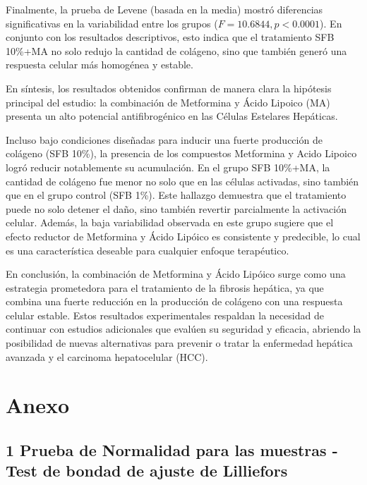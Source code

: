 \documentclass[
  11pt,
]{article}
\begin{document}
Finalmente, la prueba de Levene (basada en la media) mostró diferencias
significativas en la variabilidad entre los grupos
(\(F = 10.6844, p < 0.0001\)). En conjunto con los resultados
descriptivos, esto indica que el tratamiento SFB 10\%+MA no solo redujo
la cantidad de colágeno, sino que también generó una respuesta celular
más homogénea y estable.

En síntesis, los resultados obtenidos confirman de manera clara la
hipótesis principal del estudio: la combinación de Metformina y Ácido
Lipoico (MA) presenta un alto potencial antifibrogénico en las Células
Estelares Hepáticas.

Incluso bajo condiciones diseñadas para inducir una fuerte producción de
colágeno (SFB 10\%), la presencia de los compuestos Metformina y Acido
Lipoico logró reducir notablemente su acumulación. En el grupo SFB
10\%+MA, la cantidad de colágeno fue menor no solo que en las células
activadas, sino también que en el grupo control (SFB 1\%). Este hallazgo
demuestra que el tratamiento puede no solo detener el daño, sino también
revertir parcialmente la activación celular. Además, la baja
variabilidad observada en este grupo sugiere que el efecto reductor de
Metformina y Ácido Lipóico es consistente y predecible, lo cual es una
característica deseable para cualquier enfoque terapéutico.

En conclusión, la combinación de Metformina y Ácido Lipóico surge como
una estrategia prometedora para el tratamiento de la fibrosis hepática,
ya que combina una fuerte reducción en la producción de colágeno con una
respuesta celular estable. Estos resultados experimentales respaldan la
necesidad de continuar con estudios adicionales que evalúen su seguridad
y eficacia, abriendo la posibilidad de nuevas alternativas para prevenir
o tratar la enfermedad hepática avanzada y el carcinoma hepatocelular
(HCC).

\section{Anexo}\label{anexo}

\subsection{1 Prueba de Normalidad para las muestras - Test de bondad de
ajuste de
Lilliefors}\label{prueba-de-normalidad-para-las-muestras---test-de-bondad-de-ajuste-de-lilliefors}
\end{document}
